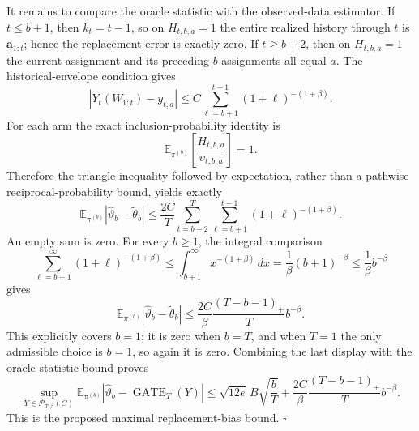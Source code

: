 It remains to compare the oracle statistic with the observed-data estimator. If \(t\le b+1\), then \(k_t=t-1\), so on \(H_{t,b,a}=1\) the entire realized history through \(t\) is \(\mathbf a_{1:t}\); hence the replacement error is exactly zero. If \(t\ge b+2\), then on \(H_{t,b,a}=1\) the current assignment and its preceding \(b\) assignments all equal \(a\). The historical-envelope condition gives
\[
\left|Y_t(W_{1:t})-y_{t,a}\right|
\le C\sum_{\ell=b+1}^{t-1}(1+\ell)^{-(1+\beta)}.
\]
For each arm the exact inclusion-probability identity is
\[
\mathbb E_{\pi^{(b)}}\left[\frac{H_{t,b,a}}{\upsilon_{t,b,a}}\right]=1.
\]
Therefore the triangle inequality followed by expectation, rather than a pathwise reciprocal-probability bound, yields exactly
\[
\mathbb E_{\pi^{(b)}}|\widehat\vartheta_b-\widetilde\theta_b|
\le \frac{2C}{T}\sum_{t=b+2}^{T}\sum_{\ell=b+1}^{t-1}(1+\ell)^{-(1+\beta)}.
\]
An empty sum is zero. For every \(b\ge1\), the integral comparison
\[
\sum_{\ell=b+1}^{\infty}(1+\ell)^{-(1+\beta)}
\le\int_{b+1}^{\infty}x^{-(1+\beta)}\,dx
=\frac1\beta(b+1)^{-\beta}
\le\frac1\beta b^{-\beta}
\]
gives
\[
\mathbb E_{\pi^{(b)}}|\widehat\vartheta_b-\widetilde\theta_b|
\le\frac{2C}{\beta}\frac{(T-b-1)_+}{T}b^{-\beta}.
\]
This explicitly covers \(b=1\); it is zero when \(b=T\), and when \(T=1\) the only admissible choice is \(b=1\), so again it is zero. Combining the last display with the oracle-statistic bound proves
\[
\sup_{Y\in\mathcal P_{T,\beta}(C)}
\mathbb E_{\pi^{(b)}}|\widehat\vartheta_b-\operatorname{GATE}_T(Y)|
\le\sqrt{12e}\,B\sqrt{\frac bT}
+\frac{2C}{\beta}\frac{(T-b-1)_+}{T}b^{-\beta}.
\]
This is the proposed maximal replacement-bias bound. \(\square\)